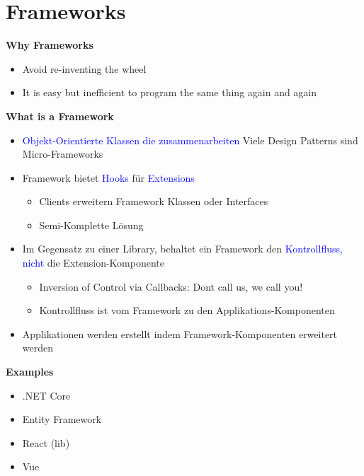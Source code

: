 \section{Frameworks}
\textbf{Why Frameworks}
\begin{itemize}
    \item Avoid re-inventing the wheel
    \item It is easy but inefficient to program the same thing again and again
\end{itemize}
\vspace{10pt}
\textbf{What is a Framework}
\begin{itemize}
    \item \textcolor{blue}{Objekt-Orientierte Klassen die zusammenarbeiten} Viele Design Patterns sind Micro-Frameworks
    \item Framework bietet \textcolor{blue}{Hooks} für \textcolor{blue}{Extensions}
    \begin{itemize}
        \item Clients erweitern Framework Klassen oder Interfaces
        \item Semi-Komplette Lösung
    \end{itemize}
    \item Im Gegensatz zu einer Library, behaltet ein Framework den \textcolor{blue}{Kontrollfluss, nicht} die Extension-Komponente
    \begin{itemize}
        \item Inversion of Control via Callbacks: Dont call us, we call you!
        \item Kontrollfluss ist vom Framework zu den Applikations-Komponenten
    \end{itemize}
    \item Applikationen werden erstellt indem Framework-Komponenten erweitert werden
\end{itemize}
\vspace{10pt}
\textbf{Examples}
\begin{itemize}
    \item .NET Core
    \item Entity Framework
    \item React (lib)
    \item Vue
\end{itemize}

